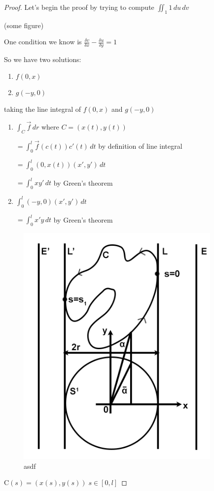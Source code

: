 \documentclass[a4paper]{book}
\numberwithin{theorem}{section}%
\begin{document}
\begin{proof}
	Let's begin the proof by trying to compute $\iint_{1} 1 \,du\,dv$

	(some figure)

	One condition we know is $\frac{\delta v}{\delta x}-\frac{\delta u}{\delta y}=1$
	
	So we have two solutions:
	\begin{enumerate}
		\item $f(0,x)$
		\item $g(-y,0)$
	\end{enumerate}
	
	taking the line integral of $f(0,x)$ and $g(-y,0)$
	\begin{enumerate}
		\item
			$\int_{C} \overrightarrow{f} \,dr$ \;\;\;where\; $C=(x(t),y(t))$
				
			$= \int_{0}^{l} \overrightarrow{f}(c(t))c'(t) \,dt$ \;\;\;by definition of line integral

			$= \int_{0}^{l} (0,x(t))(x',y') \,dt$
			
			$= \int_{0}^{l} xy' \,dt$ \;\;\;by Green's theorem
		\item
			$\int_{0}^{l} (-y,0)(x',y') \,dt$
			
			$= \int_{0}^{l} x'y \,dt$ \;\;\;by Green's theorem
	\end{enumerate}
    \begin{figure}[hbt!]
        \begin{center}   
            \includegraphics[width=100mm]{esfigure}
            \caption{asdf}
        \end{center}
    \end{figure}\leavevmode
    $\mathrm{C}(s)=(x(s),y(s))\;s\in[0,l]$
\end{proof}
\end{document}
